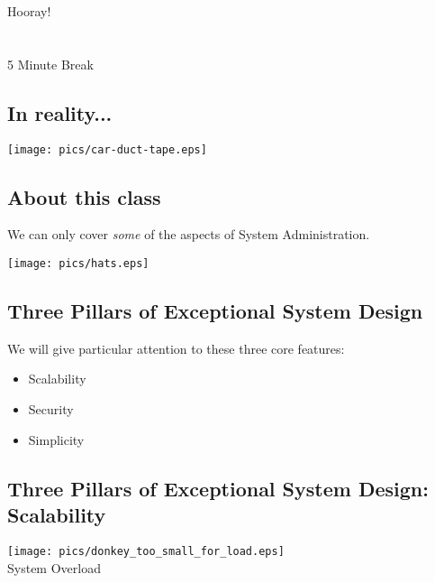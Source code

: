\documentclass[xga]{xdvislides}
\begin{document}
\newpage
\vspace*{\fill}
\begin{center}
    \Hugesize
        Hooray! \\ [1em]
    \hspace*{5mm}
    \blueline\\
    \hspace*{5mm}\\
        5 Minute Break
\end{center}
\vspace*{\fill}

\subsection{In reality...}
\vspace*{\fill}
\begin{center}
    \texttt{[image: pics/car-duct-tape.eps]}
\end{center}
\vspace*{\fill}

\subsection{About this class}
We can only cover {\em some} of the aspects of System Administration.
\vspace*{\fill}
\begin{center}
	\texttt{[image: pics/hats.eps]}
\Normalsize
\end{center}
\vspace*{\fill}

\subsection{Three Pillars of Exceptional System Design}
We will give particular attention to these three core features:
\begin{itemize}
	\item Scalability
	\item Security
	\item Simplicity
\end{itemize}

\subsection{Three Pillars of Exceptional System Design: Scalability}
\vspace*{\fill}
\begin{center}
    \texttt{[image: pics/donkey\_too\_small\_for\_load.eps]} \\
	System Overload
\end{center}
\vspace*{\fill}
\end{document}
